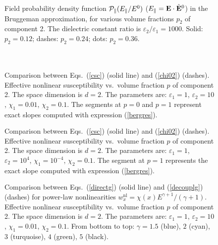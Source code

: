 \begin{figure}
\narrowtext
\vspace*{0.0cm}
\centerline{ }
\vspace*{0.0cm}
\caption{Field probability density function  ${\cal{P}}_\parallel(E_\parallel/E^0)$  ($E_\parallel={\bf E}\cdot\hat{\bf E}^0$) in  the Bruggeman approximation, for various volume  fractions $p_2$ of component 2. The dielectric  constant ratio is $\varepsilon_2/\varepsilon_1=1000$.  Solid: $p_2=0.12$; dashes: $p_2=0.24$; dots: $p_2=0.36$.\\ \\ \\ }
\label{fig3}
\end{figure}

\begin{figure}
\narrowtext
\vspace*{0.0cm}
\centerline{ }
\vspace*{0.3cm}
\caption{Comparison between Eqs.\ (\ref{csc})  (solid line) and (\ref{chi02}) (dashes). Effective  nonlinear susceptibility vs.\ volume fraction $p$ of  component 2. The space dimension is $d=2$. The  parameters are: $\varepsilon_1=1$, $\varepsilon_2=10$,  $\chi_1=0.01$, $\chi_2=0.1$. The segments at $p=0$ and  $p=1$ represent exact slopes computed with expression  (\ref{bergres}).}
\label{fig4}
\end{figure}

\begin{figure}
\narrowtext
\vspace*{0.0cm}
\centerline{ }
\vspace*{0.0cm}
\caption{Comparison between Eqs.\ (\ref{csc})  (solid line) and (\ref{chi02}) (dashes). Effective  nonlinear susceptibility vs.\ volume fraction $p$ of  component 2. The space dimension is $d=2$. The parameters  are: $\varepsilon_1=1$, $\varepsilon_2=10^4$, $\chi_1=10^{-4}$,  $\chi_2=0.1$. The segment at $p=1$ represents the exact slope  computed with expression (\ref{bergres}). }
\label{fig5}
\end{figure}

\begin{figure}
\narrowtext
\vspace*{0.0cm}
\centerline{ }
\vspace*{0.3cm}
\caption{Comparison between Eqs.\ (\ref{directg})  (solid line) and (\ref{decouplg}) (dashes) for power-law  nonlinearities $w^{\text{nl}}_x=\chi(x) E^{\gamma+1}/(\gamma+1)$.  Effective nonlinear susceptibility vs.\ volume fraction $p$ of  component 2. The space dimension is $d=2$. The parameters are:  $\varepsilon_1=1$, $\varepsilon_2=10$, $\chi_1=0.01$,  $\chi_2=0.1$. From bottom to top: $\gamma=1.5$ (blue), $2$ (cyan),  $3$ (turquoise), $4$ (green), $5$ (black). }
\label{fig6}
\end{figure}

